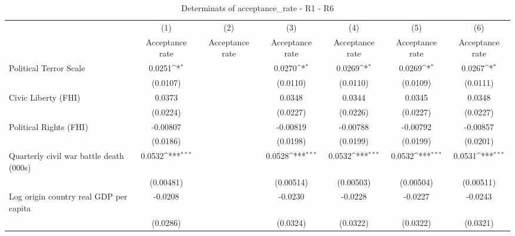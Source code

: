 \begin{table}[htbp]\centering
\def\sym#1{\ifmmode^{#1}\else\(^{#1}\)\fi}
\caption{Determinats of acceptance\_rate - R1 - R6}
\begin{tabular}{l*{6}{c}}
\hline\hline
                    &\multicolumn{1}{c}{(1)}&\multicolumn{1}{c}{(2)}&\multicolumn{1}{c}{(3)}&\multicolumn{1}{c}{(4)}&\multicolumn{1}{c}{(5)}&\multicolumn{1}{c}{(6)}\\
                    &\multicolumn{1}{c}{Acceptance rate}&\multicolumn{1}{c}{Acceptance rate}&\multicolumn{1}{c}{Acceptance rate}&\multicolumn{1}{c}{Acceptance rate}&\multicolumn{1}{c}{Acceptance rate}&\multicolumn{1}{c}{Acceptance rate}\\
\hline
Political Terror Scale&      0.0251\sym{*}  &                     &      0.0270\sym{*}  &      0.0269\sym{*}  &      0.0269\sym{*}  &      0.0267\sym{*}  \\
                    &    (0.0107)         &                     &    (0.0110)         &    (0.0110)         &    (0.0109)         &    (0.0111)         \\
[1em]
Civic Liberty (FHI) &      0.0373         &                     &      0.0348         &      0.0344         &      0.0345         &      0.0348         \\
                    &    (0.0224)         &                     &    (0.0227)         &    (0.0226)         &    (0.0227)         &    (0.0227)         \\
[1em]
Political Rights (FHI)&    -0.00807         &                     &    -0.00819         &    -0.00788         &    -0.00792         &    -0.00857         \\
                    &    (0.0186)         &                     &    (0.0198)         &    (0.0199)         &    (0.0199)         &    (0.0201)         \\
[1em]
Quarterly civil war battle death (000s)&      0.0532\sym{***}&                     &      0.0528\sym{***}&      0.0532\sym{***}&      0.0532\sym{***}&      0.0531\sym{***}\\
                    &   (0.00481)         &                     &   (0.00514)         &   (0.00503)         &   (0.00504)         &   (0.00511)         \\
[1em]
Log origin country real GDP per capita&     -0.0208         &                     &     -0.0230         &     -0.0228         &     -0.0227         &     -0.0243         \\
                    &    (0.0286)         &                     &    (0.0324)         &    (0.0322)         &    (0.0322)         &    (0.0321)         \\

\end{tabular}
\end{table}
